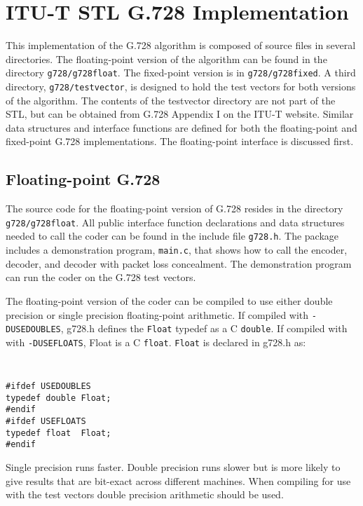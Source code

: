 \section{ITU-T STL G.728 Implementation}

This implementation of the G.728 algorithm is composed of source
files in several directories. The floating-point version of the
algorithm can be found in the directory {\tt g728/g728float}. The fixed-point
version is in {\tt g728/g728fixed}.
A third directory, {\tt g728/testvector}, is designed to hold the test
vectors for both versions of the algorithm.
The contents of the testvector directory are not part of the STL, but
can be obtained from G.728 Appendix I on the ITU-T website.
Similar data structures and interface functions are defined
for both the floating-point and fixed-point G.728 implementations.
The floating-point interface is discussed first.

\subsection {Floating-point G.728}

The source code for the floating-point version of G.728 resides in the
directory {\tt g728/g728float}. All public interface function
declarations and data structures needed to call the coder
can be found in the include
file {\tt g728.h}. The package includes a demonstration program, {\tt main.c},
that shows how to call the encoder, decoder, and decoder with
packet loss concealment. The demonstration program can
run the coder on the G.728 test vectors.

The floating-point version of the coder can be compiled
to use either double precision or single precision floating-point
arithmetic. If compiled with {\tt -DUSEDOUBLES}, g728.h defines the
{\tt Float} typedef as a C {\tt double}. If compiled with
with {\tt -DUSEFLOATS}, Float is a C {\tt float}. {\tt Float} is declared
in g728.h as:
{\tt\small
\begin{verbatim}
#ifdef USEDOUBLES
typedef double Float;
#endif
#ifdef USEFLOATS
typedef float  Float;
#endif
\end{verbatim}
}
Single precision runs faster. Double precision runs slower
but is more likely to give results that are bit-exact across
different machines. When compiling for use with the test vectors
double precision arithmetic should be used.

